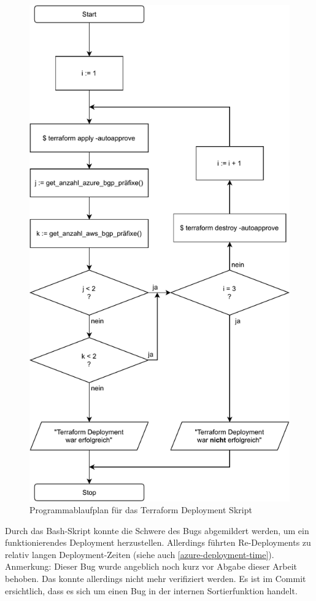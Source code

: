 \begin{figure}[h]
  \centering
  \includegraphics[scale=0.6]{Figures/programmablaufplan_bash_deploy_tf.pdf}
  \caption{Programmablaufplan für das Terraform \gls{Deployment} Skript}
  \label{grafik:programmablaufplan_bash_deploy_tf}
\end{figure}\FloatBarrier
Durch das Bash-Skript konnte die Schwere des Bugs abgemildert werden, um ein funktionierendes Deployment herzustellen. Allerdings führten Re-Deployments zu relativ langen \gls{Deployment}-Zeiten (siehe auch \ref{azure-deployment-time}).\\
Anmerkung: Dieser Bug wurde angeblich noch kurz vor Abgabe dieser Arbeit behoben. Das konnte allerdings nicht mehr verifiziert werden. Es ist im Commit ersichtlich, dass es sich um einen Bug in der internen Sortierfunktion handelt.\cite{awsfixtf2021}
